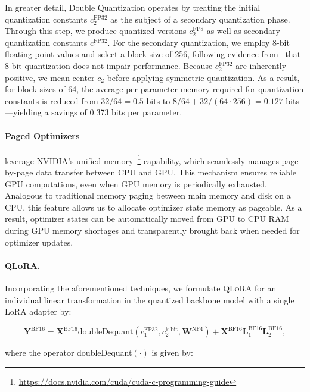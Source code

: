 In greater detail, Double Quantization operates by treating the initial quantization constants $c_2^{\text{FP32}}$ as the subject of a secondary quantization phase. Through this step, we produce quantized versions $c_2^{\text{FP8}}$ as well as secondary quantization constants $c_1^{\text{FP32}}$. For the secondary quantization, we employ 8-bit floating point values and select a block size of 256, following evidence from~\citet{dettmers2022case} that 8-bit quantization does not impair performance. Because $c_2^{\text{FP32}}$ are inherently positive, we mean-center $c_2$ before applying symmetric quantization. As a result, for block sizes of 64, the average per-parameter memory required for quantization constants is reduced from $32/64=0.5$ bits to $8/64 + 32/(64\cdot256) = 0.127$ bits—yielding a savings of 0.373 bits per parameter.

\paragraph{Paged Optimizers} leverage NVIDIA's unified memory~\footnote{\tiny \url{https://docs.nvidia.com/cuda/cuda-c-programming-guide}} capability, which seamlessly manages page-by-page data transfer between CPU and GPU. This mechanism ensures reliable GPU computations, even when GPU memory is periodically exhausted. Analogous to traditional memory paging between main memory and disk on a CPU, this feature allows us to allocate optimizer state memory as pageable. As a result, optimizer states can be automatically moved from GPU to CPU RAM during GPU memory shortages and transparently brought back when needed for optimizer updates.

\paragraph{\textsc{QLoRA}.} Incorporating the aforementioned techniques, we formulate \textsc{QLoRA} for an individual linear transformation in the quantized backbone model with a single LoRA adapter by:

\begin{equation}
    \mathbf{Y}^{\text{BF16}} =  \mathbf{X}^{\text{BF16}} \text{doubleDequant}(c_1^{\text{FP32}}, c_2^{\text{k-bit}}, \mathbf{W}^{\text{NF4}}) + \mathbf{X}^{\text{BF16}}\mathbf{L}^{\text{BF16}}_1\mathbf{L}^{\text{BF16}}_2,
\end{equation}

where the operator doubleDequant$(\cdot)$ is given by:

